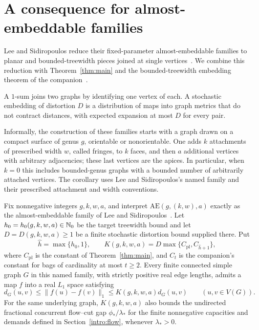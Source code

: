 \section{A consequence for almost-embeddable families}
\label{sec:consequences}

Lee and Sidiropoulos reduce their fixed-parameter almost-embeddable
families to planar and bounded-treewidth pieces joined at single
vertices~\cite[Theorem~1.7]{LS09}. We combine this reduction with
Theorem~\ref{thm:main} and the bounded-treewidth embedding theorem
of the companion~\cite[Theorem~1.1]{Treewidth108}.

A $1$-sum joins two graphs by identifying one vertex of each.
A stochastic embedding of distortion $D$ is a distribution of maps
into graph metrics that do not contract distances, with expected
expansion at most $D$ for every pair.

Informally, the construction of these families starts with a graph drawn
on a compact surface of genus $g$, orientable or nonorientable. One adds
$k$ attachments of prescribed width $w$, called fringes, to $k$ faces,
and then $a$ additional vertices with arbitrary adjacencies; these last
vertices are the apices. In particular, when $k=0$ this includes
bounded-genus graphs with a bounded number of arbitrarily attached
vertices. The corollary uses Lee and Sidiropoulos's named family and
their prescribed attachment and width conventions.

\begin{corollary}\label{cor:almost-embeddable}
Fix nonnegative integers $g,k,w,a$, and interpret
$\mathrm{AE}(g,(k,w),a)$ exactly as the almost-embeddable family of
Lee and Sidiropoulos~\cite[Theorem~1.7]{LS09}. Let
$h_0=h_0(g,k,w,a)\in\mathbb N_0$ be the target treewidth bound and let
$D=D(g,k,w,a)\ge1$ be a finite stochastic distortion bound supplied there.
Put
\[
 \widehat h=\max\{h_0,1\},\qquad
 K(g,k,w,a)=D\max\{C_{\mathrm{pl}},C_{\widehat h+1}\},
\]
where $C_{\mathrm{pl}}$ is the constant of Theorem~\ref{thm:main}, and
$C_t$ is the companion's constant for bags of cardinality at most
$t\ge2$. Every finite connected simple graph $G$ in this named family,
with strictly positive real edge lengths, admits a map $f$ into a real
$L_1$ space satisfying
\[
 d_G(u,v)\le\|f(u)-f(v)\|_1
 \le K(g,k,w,a)d_G(u,v)\qquad(u,v\in V(G)).
\]
For the same underlying graph, $K(g,k,w,a)$ also bounds the undirected
fractional concurrent flow--cut gap $\phi_*/\lambda_*$ for the finite
nonnegative capacities and demands defined in Section~\ref{intro:flow},
whenever $\lambda_*>0$.
\end{corollary}


